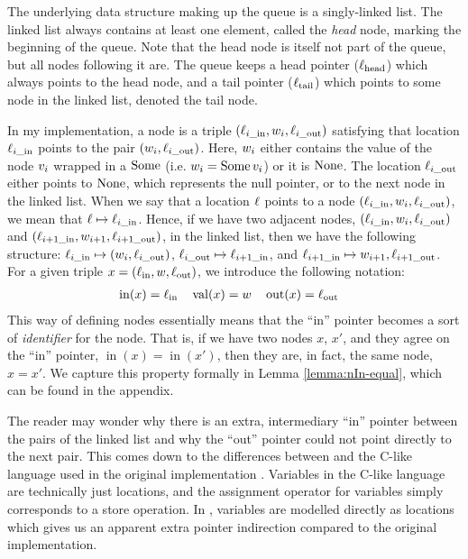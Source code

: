 \documentclass[a4paper, 10pt]{report}
\theoremstyle{definition}
\newcommand{\locin}{\loc_{\mathrm{in}}}
\newcommand{\locinM}[1]{\loc_{#1\_\mathrm{in}}}
\newcommand{\locout}{\loc_{\mathrm{out}}}
\newcommand{\locoutM}[1]{\loc_{#1\_\mathrm{out}}}
\newcommand{\locN}[1]{\loc_{\mathrm{#1}}}
\newcommand{\lochead}{\locN{head}}
\newcommand{\loctail}{\locN{tail}}
\newcommand{\nodeval}{\valB}
\newcommand{\nodevalM}[1]{\nodeval_{#1}}
\newcommand{\nIn}[1]{\operatorname{in}(#1)}
\newcommand{\nVal}[1]{\operatorname{val}(#1)}
\newcommand{\nOut}[1]{\operatorname{out}(#1)}
\newcommand{\node}{x}
\newcommand{\absvalue}{\val}
\begin{document}
The underlying data structure making up the queue is a singly-linked list. The linked list always contains at least one element, called the \emph{head} node, marking the beginning of the queue. Note that the head node is itself not part of the queue, but all nodes following it are. The queue keeps a head pointer ($\lochead$) which always points to the head node, and a tail pointer ($\loctail$) which points to some node in the linked list, denoted the tail node.

In my implementation, a node is a triple $(\locinM{i}, \nodevalM{i}, \locoutM{i})$ satisfying that location $\locinM{i}$ points to the pair $(\nodevalM{i}, \locoutM{i})$. Here, $\nodevalM{i}$ either contains the value of the node $\absvalue_i$ wrapped in a $\operatorname{Some}$ (i.e. $\nodevalM{i} = \Some \absvalue_i$) or it is $\operatorname{None}$. The location $\locoutM{i}$ either points to $\operatorname{None}$, which represents the null pointer, or to the next node in the linked list. When we say that a location $\ell$ points to a node $(\locinM{i}, \nodevalM{i}, \locoutM{i})$, we mean that $\loc \mapsto \locinM{i}$. Hence, if we have two adjacent nodes, $(\locinM{i}, \nodevalM{i}, \locoutM{i})$ and $(\locinM{i+1}, \nodevalM{i+1}, \locoutM{i+1})$, in the linked list, then we have the following structure: $\locinM{i} \mapsto (\nodevalM{i}, \locoutM{i})$, $\locoutM{i} \mapsto \locinM{i+1}$, and $\locinM{i+1} \mapsto \nodevalM{i+1}, \locoutM{i+1}$.
For a given triple $\node = (\locin, \nodeval, \locout)$, we introduce the following notation:
\begin{align*}
  &\nIn{\node} = \locin& &\nVal{\node} = \nodeval& &\nOut{\node} = \locout
\end{align*}
This way of defining nodes essentially means that the ``in'' pointer becomes a sort of \textit{identifier} for the node. That is, if we have two nodes $\node$, $\node'$, and they agree on the ``in'' pointer, $\nIn{\node} = \nIn{\node'}$, then they are, in fact, the same node, $\node = \node'$. We capture this property formally in Lemma \ref{lemma:nIn-equal}, which can be found in the appendix.

The reader may wonder why there is an extra, intermediary ``in'' pointer between the pairs of the linked list and why the ``out'' pointer could not point directly to the next pair. This comes down to the differences between \heaplang and the C-like language used in the original implementation \citep{DBLP:conf/podc/MichaelS96}. Variables in the C-like language are technically just locations, and the assignment operator for variables simply corresponds to a store operation. In \heaplang, variables are modelled directly as locations which gives us an apparent extra pointer indirection compared to the original implementation.
\end{document}
